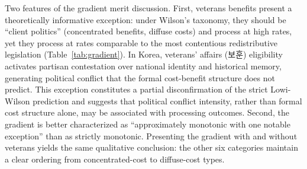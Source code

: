\documentclass[11pt]{article}
\begin{document}
Two features of the gradient merit discussion. First, veterans benefits present a theoretically informative exception: under Wilson's taxonomy, they should be ``client politics'' (concentrated benefits, diffuse costs) and process at high rates, yet they process at rates comparable to the most contentious redistributive legislation (Table~\ref{tab:gradient}). In Korea, veterans' affairs (보훈) eligibility activates partisan contestation over national identity and historical memory, generating political conflict that the formal cost-benefit structure does not predict. This exception constitutes a partial disconfirmation of the strict Lowi-Wilson prediction and suggests that political conflict intensity, rather than formal cost structure alone, may be associated with processing outcomes. Second, the gradient is better characterized as ``approximately monotonic with one notable exception'' than as strictly monotonic. Presenting the gradient with and without veterans yields the same qualitative conclusion: the other six categories maintain a clear ordering from concentrated-cost to diffuse-cost types.
\end{document}
